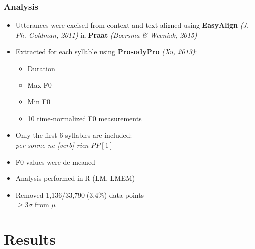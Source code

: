 \documentclass{beamer}
\begin{document}
\begin{frame}
\frametitle{Analysis}
\begin{itemize}
\item Utterances were excised from context and text-aligned using \textbf{EasyAlign} \textit{(J.-Ph. Goldman, 2011)} in \textbf{Praat} \textit{(Boersma \& Weenink, 2015)}
\item Extracted for each syllable using \textbf{ProsodyPro} \textit{(Xu, 2013)}:
\begin{itemize}
\item Duration
\item Max F0
\item Min F0
\item 10 time-normalized F0 measurements
\end{itemize}
\item Only the first 6 syllables are included:\\ \textit{per sonne ne [verb] rien PP$[1]$}
\item F0 values were de-meaned
\item Analysis performed in R (LM, LMEM)
\item Removed 1,136/33,790 ($3.4\%$) data points \\$\geq3\sigma$ from $\mu$
\end{itemize}
\end{frame}


\section{Results}
\end{document}
